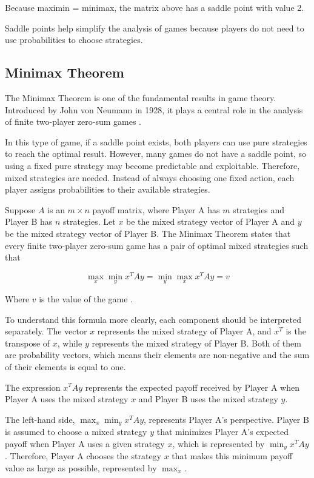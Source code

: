 \documentclass[12pt,a4paper]{article}
\begin{document}
\noindent{}


Because maximin = minimax, the matrix above has a saddle point with value 2.

Saddle points help simplify the analysis of games because players do not need to use probabilities to choose strategies.




\subsection{Minimax Theorem}

The Minimax Theorem is one of the fundamental results in game theory. Introduced by John von Neumann in 1928, it plays a central role in the analysis of finite two-player zero-sum games \cite{thie2008}.

In this type of game, if a saddle point exists, both players can use pure strategies to reach the optimal result. However, many games do not have a saddle point, so using a fixed pure strategy may become predictable and exploitable. Therefore, mixed strategies are needed. Instead of always choosing one fixed action, each player assigns probabilities to their available strategies.

Suppose \(A\) is an \(m \times n\) payoff matrix, where Player A has \(m\) strategies and Player B has \(n\) strategies. Let \(x\) be the mixed strategy vector of Player A and \(y\) be the mixed strategy vector of Player B. The Minimax Theorem states that every finite two-player zero-sum game has a pair of optimal mixed strategies such that

\[
\max_x \min_y x^T A y = \min_y \max_x x^T A y = v
\]

Where \(v\) is the value of the game \cite{thie2008}.

To understand this formula more clearly, each component should be interpreted separately.  The vector \(x\) represents the mixed strategy of Player A, and \(x^T\) is the transpose of \(x\), while \(y\) represents the mixed strategy of Player B. Both of them are probability vectors, which means their elements are non-negative and the sum of their elements is equal to one. 

The expression \(x^T A y\) represents the expected payoff received by Player A when Player A uses the mixed strategy \(x\) and Player B uses the mixed strategy \(y\).

The left-hand side, \(\max_x \min_y x^T A y\), represents Player A's perspective. Player B is assumed to choose a mixed strategy \(y\) that minimizes Player A's expected payoff when Player A uses a given strategy \(x\), which is represented by \(\min_y x^T A y\). Therefore, Player A chooses the strategy \(x\) that makes this minimum payoff value as large as possible, represented by \(\max_x\).
\end{document}
